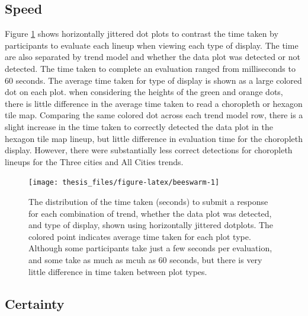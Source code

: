 \documentclass{monashthesis}
\begin{document}
\hypertarget{speed}{%
\subsection{Speed}\label{speed}}

Figure \ref{fig:beeswarm} shows horizontally jittered dot plots to contrast the time taken by participants to evaluate each lineup when viewing each type of display. The time are also separated by trend model and whether the data plot was detected or not detected. The time taken to complete an evaluation ranged from milliseconds to 60 seconds. The average time taken for type of display is shown as a large colored dot on each plot. when considering the heights of the green and orange dots, there is little difference in the average time taken to read a choropleth or hexagon tile map. Comparing the same colored dot across each trend model row, there is a slight increase in the time taken to correctly detected the data plot in the hexagon tile map lineup, but little difference in evaluation time for the choropleth display. However, there were substantially less correct detections for choropleth lineups for the Three cities and All Cities trends.

\begin{figure}

{\centering \texttt{[image: thesis\_files/figure-latex/beeswarm-1]} 

}

\caption{The distribution of the time taken (seconds) to submit a response for each combination of trend, whether the data plot was detected, and type of display, shown using horizontally jittered dotplots. The colored point indicates average time taken for each plot type. Although some participants take just a few seconds per evaluation, and some take as much as mcuh as 60 seconds, but there is very little difference in time taken between plot types.}\label{fig:beeswarm}
\end{figure}

\hypertarget{certainty}{%
\subsection{Certainty}\label{certainty}}
\end{document}

